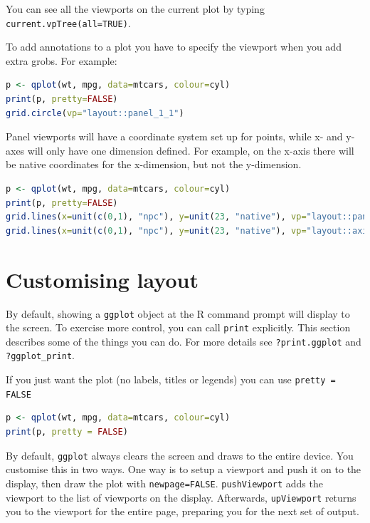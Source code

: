 You can see all the viewports on the current plot by typing {\tt current.vpTree(all=TRUE)}.

To add annotations to a plot you have to specify the viewport when you add extra grobs.  For example:

\begin{lstlisting}[language = R]
p <- qplot(wt, mpg, data=mtcars, colour=cyl)
print(p, pretty=FALSE)
grid.circle(vp="layout::panel_1_1")
\end{lstlisting}

Panel viewports will have a coordinate system set up for points, while x- and y- axes will only have one dimension defined.  For example, on the x-axis there will be native coordinates for the x-dimension, but not the y-dimension.

\begin{lstlisting}[language = R]
p <- qplot(wt, mpg, data=mtcars, colour=cyl)
print(p, pretty=FALSE)
grid.lines(x=unit(c(0,1), "npc"), y=unit(23, "native"), vp="layout::panel_1_1")
grid.lines(x=unit(c(0,1), "npc"), y=unit(23, "native"), vp="layout::axis_v_1_1")
\end{lstlisting}

\section{Customising layout}\label{sec:grid_layout}

By default, showing a {\tt ggplot} object at the R command prompt will display to the screen.  To exercise more control, you can call {\tt print} explicitly.  This section describes some of the things you can do.  For more details see {\tt ?print.ggplot} and {\tt ?ggplot\_print}.

If you just want the plot (no labels, titles or legends) you can use {\tt pretty = FALSE}

\begin{lstlisting}[language = R]
p <- qplot(wt, mpg, data=mtcars, colour=cyl)
print(p, pretty = FALSE)
\end{lstlisting}

By default, {\tt ggplot} always clears the screen and draws to the entire device.  You customise this in two ways. One way is to setup a viewport and push it on to the display, then draw the plot with {\tt newpage=FALSE}. {\tt pushViewport} adds the viewport to the list of viewports on the display.   Afterwards, {\tt upViewport} returns you to the viewport for the entire page, preparing you for the next set of output.

